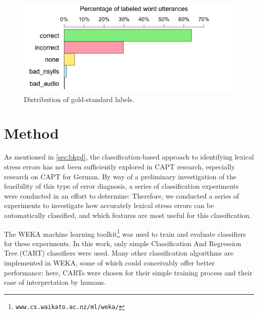 \documentclass[a4paper]{article}
\newcommand{\TODO}[1]{{\color{red}\textbf{[TODO #1]}}}
\begin{document}
		\begin{figure}
			\centering
			\includegraphics[width=\columnwidth]{overallJudgments-axisTop-noLabels}
			\caption{
			Distribution of gold-standard labels.
			}
			\label{fig:errors}
		\end{figure}
	
	
	
	
	\section{Method}
	\label{sec:method}
	
	As mentioned in \cref{sec:bkgd}, the classification-based approach to identifying lexical stress errors has not been sufficiently explored in CAPT research, especially research on CAPT for German. 
	By way of a preliminary investigation of the feasibility of this type of error diagnosis, a series of classification experiments were conducted in an effort to determine:
	Therefore, we conducted a series of experiments to investigate
	 how accurately lexical stress errors can be automatically classified, 
	and
	 which features 
	 are most useful for this classification.
	
	 
	 The WEKA machine learning toolkit\footnote{\texttt{www.cs.waikato.ac.nz/ml/weka/}} was used to train and evaluate classifiers for these experiments. In this work, only simple Classification And Regression Tree (CART) classifiers %
	 were used.
	 Many other classification algorithms are implemented in WEKA, some of which could  conceivably offer better performance; here, CARTs were chosen for their simple training process and their ease of interpretation by humans. 
\end{document}
